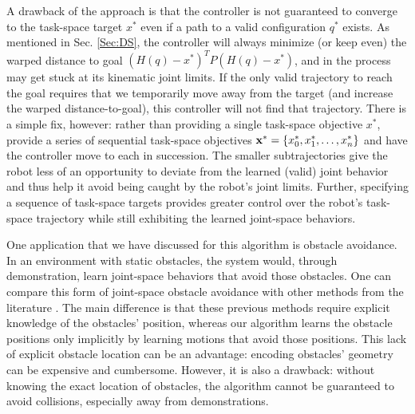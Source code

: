 \documentclass[letterpaper, 10 pt, conference,fleqn]{ieeeconf}
\begin{document}
A drawback of the approach is that the controller is not guaranteed to converge to the task-space target $x^*$ even if a path to a valid configuration $q^*$ exists. As mentioned in Sec. \ref{Sec:DS}, the controller will always minimize (or keep even) the warped distance to goal $(H(q) - x^*)^TP(H(q) - x^*)$, and in the process may get stuck at its kinematic joint limits. If the only valid trajectory to reach the goal requires that we temporarily move away from the target (and increase the warped distance-to-goal), this controller will not find that trajectory. There is a simple fix, however: rather than providing a single task-space objective $x^*$, provide a series of sequential task-space objectives $\begin{bf}x^*\end{bf} = \{ x^*_0, x^*_1, \dots, x^*_n\}$ and have the controller move to each in succession. The smaller subtrajectories give the robot less of an opportunity to deviate from the learned (valid) joint behavior and thus help it avoid being caught by the robot's joint limits. Further, specifying a sequence of task-space targets provides greater control over the robot's task-space trajectory while still exhibiting the learned joint-space behaviors.

One application that we have discussed for this algorithm is obstacle avoidance. In an environment with static obstacles, the system would, through demonstration, learn joint-space behaviors that avoid those obstacles. One can compare this form of joint-space obstacle avoidance with other methods from the literature \cite{sciavicco1988solution,petrivc2013smooth}. The main difference is that these previous methods require explicit knowledge of the obstacles' position, whereas our algorithm learns the obstacle positions only implicitly by learning motions that avoid those positions. This lack of explicit obstacle location can be an advantage: encoding obstacles' geometry can be expensive and cumbersome. However, it is also a drawback: without knowing the exact location of obstacles, the algorithm cannot be guaranteed to avoid collisions, especially away from demonstrations.

\end{document}

